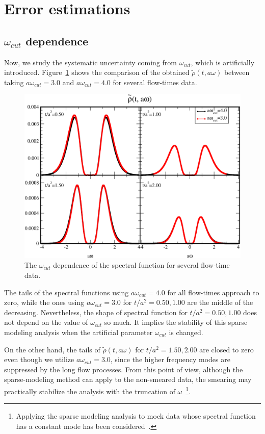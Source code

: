 \documentclass[a4paper,11pt]{article}
\begin{document}
\section{Error estimations}\label{sec:error}
\subsection{ $\omega_{cut}$ dependence}\label{sec:omega-deps}
Now, we study the systematic uncertainty coming from $\omega_{cut}$, which is artificially introduced.
Figure~\ref{fig:rho-omegamax-deps} shows the comparison of the obtained $\tilde{\rho}(t,a\omega)$ between taking $a\omega_{cut}=3.0$ and $a\omega_{cut}=4.0$ for several flow-times data.
\begin{figure}[h]
\begin{center}
\includegraphics[scale=0.45]{./rho-center-omegamax-deps.pdf}
\caption{The $\omega_{cut}$ dependence of the spectral function for several flow-time data.   }
\label{fig:rho-omegamax-deps}
\end{center}
\end{figure}
The tails of the spectral functions using $a\omega_{cut}=4.0$ for all flow-times approach to zero, while the ones using $a \omega_{cut}=3.0$ for $t/a^2=0.50, 1.00$ are the middle of the decreasing.
Nevertheless, the shape of spectral function for $t/a^2=0.50, 1.00$ does not depend on the value of $\omega_{cut}$ so much.
It implies the stability of this sparse modeling analysis when the artificial parameter $\omega_{cut}$ is changed.

On the other hand, the tails of $\tilde{\rho}(t,a\omega)$ for $t/a^2=1.50, 2.00$ are closed to zero even though we utilize $a\omega_{cut}=3.0$, since the higher frequency modes are suppressed by the long flow processes.
From this point of view, although the sparse-modeling method can apply to the non-smeared data, the smearing may practically stabilize the analysis with the truncation of $\omega$~{\footnote{Applying the sparse modeling analysis  to mock data whose spectral function has a constant mode has been considered~\cite{Tomiya}. }}. 
\end{document}

